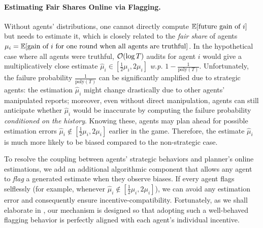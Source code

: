 \paragraph{Estimating Fair Shares Online via Flagging.}
Without agents' distributions, one cannot directly compute $\E[\text{future gain of }i]$ but needs to estimate it, which is closely related to the \textit{fair share} of agents $\mu_i=\E[\text{gain of }i\text{ for one round when all agents are truthful}]$. In the hypothetical case where all agents were truthful, $\operatorname{\mathcal O}(\log T)$ audits for agent $i$ would give a multiplicatively close estimate $\hat \mu_i\in [\frac 12 \mu_i,2\mu_i]$ \textit{w.p.} $1-\frac{1}{\text{poly}(T)}$. Unfortunately, the failure probability $\frac{1}{\text{poly}(T)}$ can be significantly amplified due to strategic agents: the estimation $\hat \mu_i$ might change drastically due to other agents' manipulated reports; moreover, even without direct manipulation, agents can still anticipate whether $\hat \mu_i$ would be inaccurate by computing the failure probability \emph{conditioned on the history}. Knowing these, agents may plan ahead for possible estimation errors $\hat \mu_i\not \in [\frac 12\mu_i,2\mu_i]$ earlier in the game. Therefore, the estimate $\hat \mu_i$ is much more likely to be biased compared to the non-strategic case.

To resolve the coupling between agents' strategic behaviors and planner's online estimations, we add an additional algorithmic component that allows any agent to \textit{flag} a generated estimate when they observe biases. If every agent flags selflessly (for example, whenever $\hat\mu_i\notin[\frac{1}{2}\mu_i,2\mu_i]$), we can avoid {any} estimation error and consequently ensure incentive-compatibility. Fortunately, as we shall elaborate in , our mechanism is designed so that adopting such a well-behaved flagging behavior is perfectly aligned with each agent's individual incentive.

